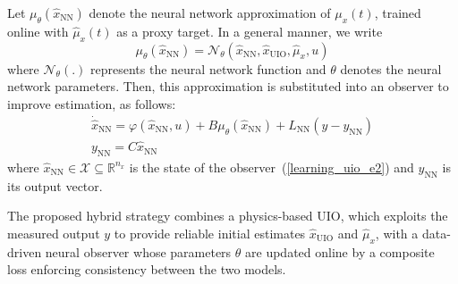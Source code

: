 \documentclass{ifacconf}
\def\eqref#1{(\ref{#1})}
\def\nn{\mathrm{NN}}
\def\uio{\mathrm{UIO}}
\def\Lo{L}
\begin{document}
Let $\mu_{\theta}(\hat{x}_{\nn})$ denote the neural network approximation of $\mu_x(t)$, trained online with $\hat{\mu}_{x}(t)$ as a proxy target. In a general manner, we write
\begin{equation}\label{learning_uio_e1}
\mu_{\theta}(\hat{x}_{\nn}) = \mathcal{N}_{\theta}(\hat{x}_{\nn},\hat{x}_{\uio}, \hat{\mu}_{x},u)
\end{equation}
where $\mathcal{N}_{\theta}(.)$ represents the neural network function and $\theta$ denotes the neural network parameters. Then, this approximation is substituted into an observer to improve estimation, as follows:
\begin{equation}\label{learning_uio_e2}
    \begin{array}{l}
        \dot{\hat{x}}_{\nn} = \varphi(\hat{x}_{\nn},u) + B \mu_{\theta}(\hat{x}_{\nn}) + \Lo_{\nn} \left( y - y_{\nn} \right) \\
        y_{\nn} = C \hat{x}_{\nn}
    \end{array}
\end{equation}
where $\hat{x}_{\nn}\in \mathcal{X} \subseteq\mathbb{R}^{n_x}$ is the state of the observer~\eqref{learning_uio_e2} and $y_{\nn}$ is its output vector.

The proposed hybrid strategy combines a physics-based UIO, which exploits the measured output $y$ to provide reliable initial estimates $\hat{x}_{\uio}$ and $\hat{\mu}_{x}$, with a data-driven neural observer whose parameters $\theta$ are updated online by a composite loss enforcing consistency between the two models.
\end{document}
